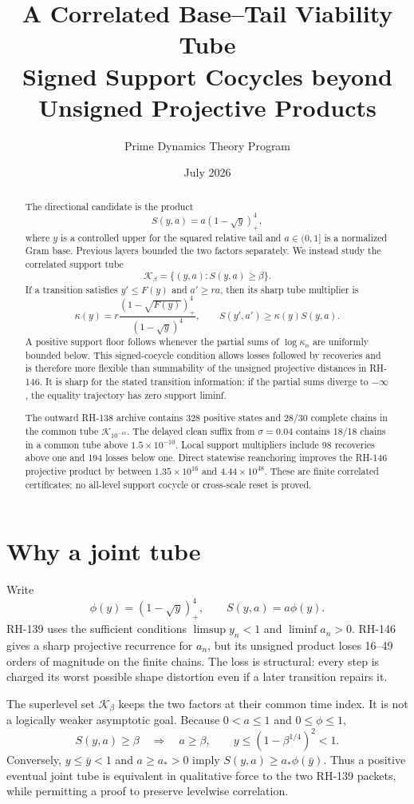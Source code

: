 \documentclass[12pt]{article}
\title{A Correlated Base--Tail Viability Tube\\\large Signed Support Cocycles beyond Unsigned Projective Products}
\author{Prime Dynamics Theory Program}
\date{July 2026}
\begin{document}
\maketitle

\begin{abstract}
The directional candidate is the product
\[
 S(y,a)=a(1-\sqrt y)_+^4,
 \]
where $y$ is a controlled upper for the squared relative tail and
$a\in(0,1]$ is a normalized Gram base.  Previous layers bounded the two
factors separately.  We instead study the correlated support tube
\[
 \mathcal K_\beta=\{(y,a):S(y,a)\geq\beta\}.
\]
If a transition satisfies $y'\leq F(y)$ and $a'\geq r a$, then its sharp
tube multiplier is
\[
 \kappa(y)=r\frac{(1-\sqrt{F(y)})_+^4}{(1-\sqrt y)^4},
 \qquad S(y',a')\geq\kappa(y)S(y,a).
\]
A positive support floor follows whenever the partial sums of
$\log\kappa_n$ are uniformly bounded below.  This signed-cocycle condition
allows losses followed by recoveries and is therefore more flexible than
summability of the unsigned projective distances in RH-146.  It is sharp for
the stated transition information: if the partial sums diverge to
$-\infty$, the equality trajectory has zero support liminf.

The outward RH-138 archive contains 328 positive states and 28/30 complete
chains in the common tube $\mathcal K_{10^{-10}}$.  The delayed clean suffix
from $\sigma=0.04$ contains 18/18 chains in a common tube above
$1.5\times10^{-10}$.  Local support multipliers include 98 recoveries above
one and 194 losses below one.  Direct statewise reanchoring improves the
RH-146 projective product by between $1.35\times10^{16}$ and
$4.44\times10^{48}$.  These are finite correlated certificates; no
all-level support cocycle or cross-scale reset is proved.
\end{abstract}

\section{Why a joint tube}
Write
\[
 \phi(y)=(1-\sqrt y)_+^4,
 \qquad S(y,a)=a\phi(y).
\]
RH-139 uses the sufficient conditions $\limsup y_n<1$ and
$\liminf a_n>0$.  RH-146 gives a sharp projective recurrence for $a_n$, but
its unsigned product loses 16--49 orders of magnitude on the finite chains.
The loss is structural: every step is charged its worst possible shape
distortion even if a later transition repairs it.

The superlevel set $\mathcal K_\beta$ keeps the two factors at their common
time index.  It is not a logically weaker asymptotic goal.  Because
$0<a\leq1$ and $0\leq\phi\leq1$,
\begin{equation}\label{eq:implications}
 S(y,a)\geq\beta
 \quad\Longrightarrow\quad
 a\geq\beta,
 \qquad
 y\leq(1-\beta^{1/4})^2<1.
\end{equation}
Conversely, $y\leq\bar y<1$ and $a\geq a_*>0$ imply
$S(y,a)\geq a_*\phi(\bar y)$.  Thus a positive eventual joint tube is
equivalent in qualitative force to the two RH-139 packets, while permitting
a proof to preserve levelwise correlation.
\end{document}
